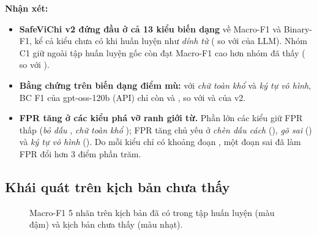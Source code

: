 \textbf{Nhận xét:}
\begin{itemize}
  \item \textbf{SafeViChi v2 đứng đầu ở cả 13 kiểu biến dạng} về Macro-F1 và Binary-F1, kể cả kiểu chưa có
        khi huấn luyện như \emph{dính từ} ( so với  của LLM).
        Nhóm C1 giữ ngoài tập huấn luyện gốc còn đạt Macro-F1 cao hơn nhóm đã thấy ( so
        với ).
  \item \textbf{Bằng chứng trên biến dạng điểm mù:} với \emph{chữ toàn khổ} và \emph{ký tự vô hình}, BC F1 của
        gpt-oss-120b (API) chỉ còn  và , so với
         và  của v2.
  \item \textbf{FPR tăng ở các kiểu phá vỡ ranh giới từ.} Phần lớn các kiểu giữ FPR thấp (\emph{bỏ dấu}
        , \emph{chữ toàn khổ} ); FPR tăng chủ yếu ở \emph{chèn dấu cách} (), \emph{gõ
        sai} () và \emph{ký tự vô hình} (). Do mỗi kiểu chỉ có
        khoảng  đoạn , một đoạn sai đã làm FPR đổi hơn 3 điểm phần trăm.
\end{itemize}

\subsection{Khái quát trên kịch bản chưa thấy}

\begin{figure}[H]
\centering

\caption{Macro-F1 5 nhãn trên kịch bản đã có trong tập huấn luyện (màu đậm) và kịch bản chưa thấy (màu nhạt).}
\label{fig:p3-kichban}
\end{figure}

